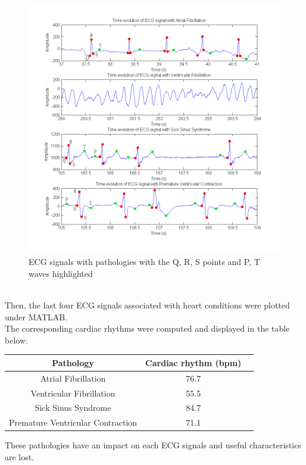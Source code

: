 \documentclass[11pt]{article}
\begin{document}
		\begin{figure}[ht]
			\centering
			\includegraphics[scale=0.65]{images/Q312.png}
			\caption{ECG signals with pathologies with the Q, R, S points and P, T waves highlighted}
			\label{Q312}
		\end{figure}
		\\
		Then, the last four ECG signals associated with heart conditions were plotted under MATLAB.\\
		The corresponding cardiac rhythms were computed and displayed in the table below.\\ 
		\begin{center}
			\begin{tabular}{|c|c|c|}
				\hline
				\textbf{Pathology} & \textbf{Cardiac rhythm (bpm)} \\
				\hline
				Atrial Fibrillation & 76.7 \\ 
				\hline
				Ventricular Fibrillation & 55.5 \\
				\hline
				Sick Sinus Syndrome & 84.7 \\
				\hline
				Premature Ventricular Contraction & 71.1 \\
				\hline
			\end{tabular}
		\end{center}
		These pathologies have an impact on each ECG signals and useful characteristics are lost.\\
\end{document}
